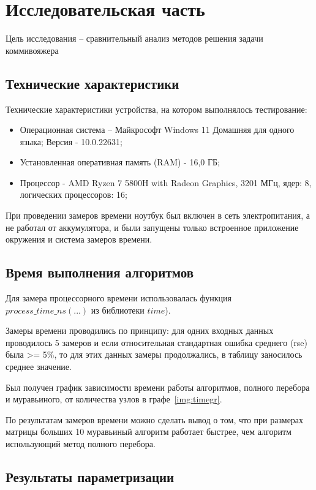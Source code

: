 \chapter{Исследовательская часть}

Цель исследования -- сравнительный анализ методов решения задачи коммивояжера

\section{Технические характеристики}
Технические характеристики устройства, на котором выполнялось тестирование:
\begin{itemize}
	\item {Операционная система – Майкрософт Windows 11 Домашняя для одного языка; Версия - 10.0.22631;}
	\item {Установленная оперативная память (RAM) - 16,0 ГБ;}
	\item {Процессор - AMD Ryzen 7 5800H with Radeon Graphics, 3201 МГц, ядер: 8, логических процессоров: 16;}
\end{itemize}

При проведении замеров времени ноутбук был включен в сеть электропитания, а не работал от аккумулятора, и были запущены только встроенное приложение окружения и система замеров времени.

\section{Время выполнения алгоритмов}
Для замера процессорного времени использовалась функция $process\_time\_ns(...)$ из библиотеки $time$\cite{python-time}).

Замеры времени проводились по принципу: для одних входных данных проводилось 5 замеров и если относительная стандартная ошибка среднего (rse) была >= 5\%, то для этих данных замеры продолжались, в таблицу заносилось среднее значение.

Был получен график зависимости времени работы алгоритмов, полного перебора и муравьиного,  от количества узлов в графе~\ref{img:timegr}.
\FloatBarrier
{}
\FloatBarrier

По результатам замеров времени можно сделать вывод о том, что при размерах матрицы больших 10 муравьиный алгоритм работает быстрее, чем алгоритм использующий метод полного перебора.

\section{Результаты параметризации}

